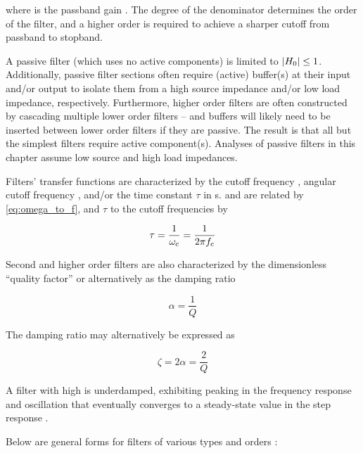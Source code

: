 where \Hpass is the passband gain \autocite[8.5]{basic-linear-design-adi}.
The degree of the denominator determines the order of the filter, and a higher order is required to achieve a sharper cutoff from passband to stopband.

A passive filter (which uses no active components) is limited to \(\lvert H_0\rvert \leq 1\).
Additionally, passive filter sections often require (active) buffer(s) at their input and/or output to isolate them from a high source impedance and/or low load impedance, respectively.
Furthermore, higher order filters are often constructed by cascading multiple lower order filters -- and buffers will likely need to be inserted between lower order filters if they are passive.
The result is that all but the simplest filters require active component(s).
Analyses of passive filters in this chapter assume low source and high load impedances.

Filters' transfer functions are characterized by the cutoff frequency \fcutoff, angular cutoff frequency \wcutoff, and/or the time constant \(\tau\) in \si{\second}.
\fcutoff and \wcutoff are related by \eqref{eq:omega_to_f}, and \(\tau\) to the cutoff frequencies by

\begin{equation}
	\tau = \frac{1}{\omega_\mathrm{c}} = \frac{1}{2\pi f_\mathrm{c}}
	\label{eq:tau_to_cutoff_frequency}
\end{equation}

Second and higher order filters are also characterized by the dimensionless ``quality factor'' \Q or alternatively as the damping ratio

\begin{equation}
	\alpha = \frac{1}{Q}
	\label{eq:filter_Q_to_damping_ratio1}
\end{equation}

The damping ratio may alternatively be expressed as

\begin{equation}
	\zeta = 2\alpha = \frac{2}{Q}
	\label{eq:filter_Q_to_damping_ratio2}
\end{equation}

A filter with high \Q is underdamped, exhibiting peaking in the frequency response and oscillation that eventually converges to a steady-state value in the step response \autocite[8.7]{basic-linear-design-adi}.

Below are general forms for filters of various types and orders \autocite[for second-order equations see][8.13]{basic-linear-design-adi}:

